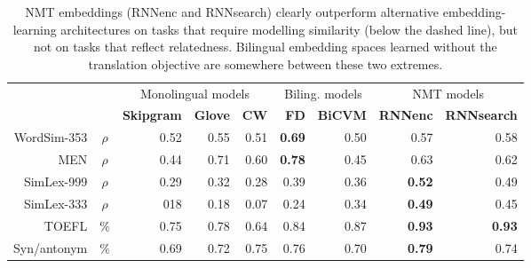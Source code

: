 \begin{table}[t]
\begin{center}
\begin{tabular}{r c | r  r  r  | r r | r r |}
\multicolumn{2}{c|}{~} &\multicolumn{3}{c|}{Monolingual models}  & \multicolumn{2}{c|}{\small Biling. models} & \multicolumn{2}{c|}{NMT models}\\  
    \multicolumn{2}{c|}{~} &\bf Skipgram &\bf Glove &\bf CW & \bf FD & \bf BiCVM & \bf RNNenc &\bf RNNsearch \\ 
\hline
WordSim-353   & \(\rho\) & 0.52 & 0.55 & 0.51 &{\bf  0.69} & 0.50 &   0.57 &  0.58 \\
MEN & \(\rho\) & 0.44 & 0.71 & 0.60 & {\bf 0.78} & 0.45 &  0.63 &  0.62  \\
\hdashline
SimLex-999 & \(\rho\) & 0.29 & 0.32 & 0.28 & 0.39 & 0.36 &   {\bf 0.52} &  0.49 \\
SimLex-333 & \(\rho\) &  018&0.18  &0.07  & 0.24  &  0.34 & { \bf 0.49}   & 0.45   \\
TOEFL & \(\%\) & 0.75 & 0.78 & 0.64 & 0.84 & 0.87 &  {\bf 0.93} &  {\bf 0.93} \\
Syn/antonym & \(\%\) & 0.69  & 0.72  &  0.75 & 0.76 & 0.70 &  {\bf 0.79} & 0.74 \\
\end{tabular}
\caption{ NMT embeddings (RNNenc and RNNsearch) clearly outperform alternative embedding-learning architectures on tasks that require modelling similarity (below the dashed line), but not on tasks that reflect relatedness. Bilingual embedding spaces learned without the translation objective are somewhere between these two extremes.}
\label{table:perf}
\end{center}
\vspace{-5mm}
\end{table}


